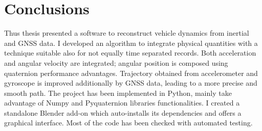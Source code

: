 \chapter{Conclusions}
\label{chap:conclusions}

Thus thesis presented a software to reconstruct vehicle dynamics from inertial and GNSS data.
I developed an algorithm to integrate physical quantities with a technique suitable also for not equally time separated records. Both acceleration and angular velocity are integrated; angular position is composed using quaternion performance advantages.
Trajectory obtained from accelerometer and gyroscope is improved additionally by GNSS data, leading to a more precise and smooth path.
The project has been implemented in Python, mainly take advantage of Numpy and Pyquaternion libraries functionalities.
I created a standalone Blender add-on which auto-installs its dependencies and offers a graphical interface. Most of the code has been checked with automated testing.

